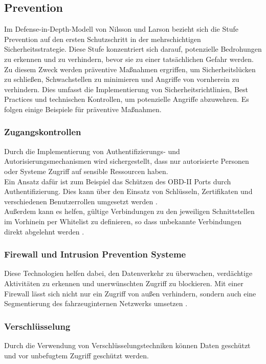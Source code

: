 \subsection{Prevention}
Im Defense-in-Depth-Modell von Nilsson und Larson bezieht sich die Stufe Prevention auf den ersten Schutzschritt in der mehrschichtigen Sicherheitsstrategie. Diese Stufe konzentriert sich darauf, potenzielle Bedrohungen zu erkennen und zu verhindern, bevor sie zu einer tatsächlichen Gefahr werden.
Zu diesem Zweck werden präventive Maßnahmen ergriffen, um Sicherheitslücken zu schließen, Schwachstellen zu minimieren und Angriffe von vornherein zu verhindern. Dies umfasst die Implementierung von Sicherheitsrichtlinien, Best Practices und technischen Kontrollen, um potenzielle Angriffe abzuwehren. Es  folgen einige Beispiele für präventive Maßnahmen.

\subsubsection{Zugangskontrollen}
Durch die Implementierung von Authentifizierungs- und Autorisierungsmechanismen wird sichergestellt, dass nur autorisierte Personen oder Systeme Zugriff auf sensible Ressourcen haben.\\
Ein Ansatz dafür ist zum Beispiel das Schützen des \acs{OBD}-II Ports durch Authentifizierung. Dies kann über den Einsatz von Schlüsseln, Zertifikaten und verschiedenen Benutzerrollen umgesetzt werden \cite[133]{Wurm.2022}.\\
Außerdem kann es helfen, gültige Verbindungen zu den jeweiligen Schnittstellen im Vorhinein per Whitelist zu definieren, so dass unbekannte Verbindungen direkt abgelehnt werden \cite[185]{Wurm.2022}.


\subsubsection{Firewall und Intrusion Prevention Systeme}
Diese Technologien helfen dabei, den Datenverkehr zu überwachen, verdächtige Aktivitäten zu erkennen und unerwünschten Zugriff zu blockieren.
Mit einer Firewall lässt sich nicht nur ein Zugriff von außen verhindern, sondern auch eine Segmentierung des fahrzeuginternen Netzwerks umsetzen \cite[147]{Wurm.2022}.


\subsubsection{Verschlüsselung}
Durch die Verwendung von Verschlüsselungstechniken können Daten geschützt und vor unbefugtem Zugriff geschützt werden.

